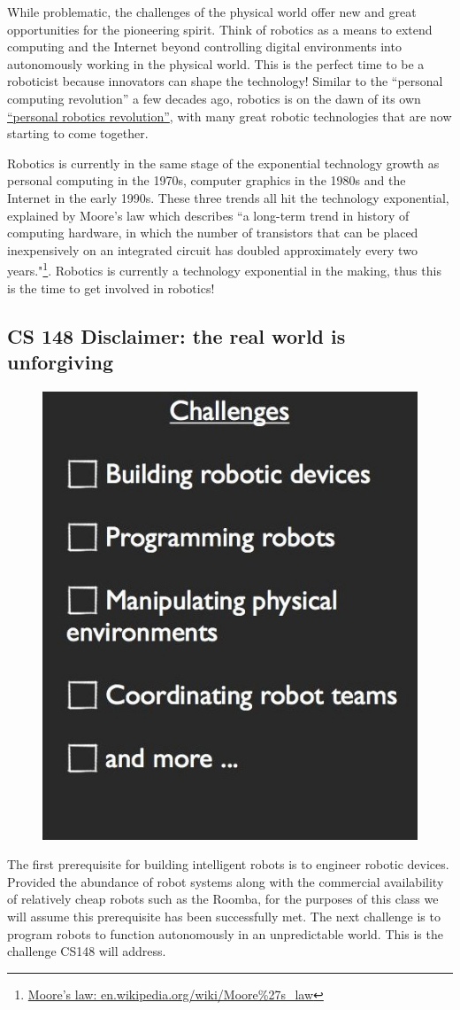 While problematic, the challenges of the physical world offer new and great opportunities for the pioneering spirit.  Think of robotics as a means to extend computing and the Internet beyond controlling digital environments into autonomously working in the physical world.  This is the perfect time to be a roboticist because innovators can shape the technology!  Similar to the ``personal computing revolution'' a few decades ago, robotics is on the dawn of its own \href{http://fora.tv/2009/05/30/Rodney\_Brooks\_Remaking\_Manufacturing\_With\_Robotics}{``personal robotics revolution''}, with many great robotic technologies that are now starting to come together. 

Robotics is currently in the same stage of the exponential technology growth as personal computing in the 1970s, computer graphics in the 1980s and the Internet in the early 1990s.  These three trends all hit the technology exponential, explained by Moore's law which describes ``a long-term trend in history of computing hardware, in which the number of transistors that can be placed inexpensively on an integrated circuit has doubled approximately every two years."\footnote{\href{http://en.wikipedia.org/wiki/Moore\%27s_law}{Moore's law: en.wikipedia.org/wiki/Moore\%27s\_law}}. Robotics is currently a technology exponential in the making, thus this is the time to get involved in robotics!

\subsection{CS 148 Disclaimer: the real world is unforgiving}

\begin{figure}
\includegraphics[width=0.3\columnwidth]{figures/1_challenges.jpg}
\end{figure}

The first prerequisite for building intelligent robots is to engineer robotic devices. Provided the abundance of robot systems along with the commercial availability of relatively cheap robots such as the Roomba, for the purposes of this class we will assume this prerequisite has been successfully met. The next challenge is to program robots to function autonomously in an unpredictable world. This is the challenge CS148 will address.


